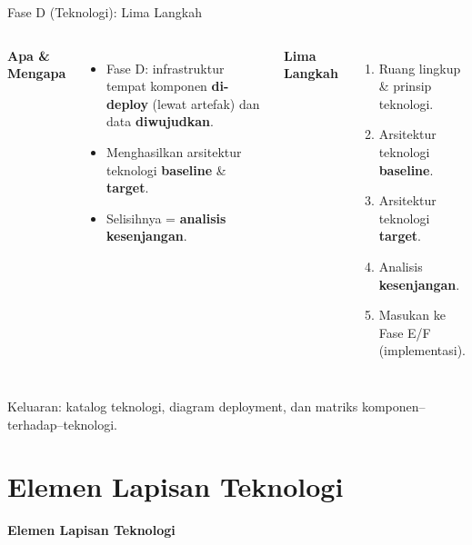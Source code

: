 \documentclass[aspectratio=169, table]{beamer}
\newcommand{\sectionframe}[1]{%
  \begin{frame}{\hfill}
    \centering
    \Huge{\textbf{#1}}
  \end{frame}
}
\newcommand{\takeaway}[1]{%
  \vspace{4pt}
  {\footnotesize #1}
}
\begin{document}
\begin{frame}{Fase D (Teknologi): Lima Langkah}
  \vspace{2pt}
  \footnotesize
  \begin{columns}[t]
    \textbf{Apa \& Mengapa}
    \begin{itemize}\setlength{\itemsep}{2.5pt}
      \item Fase D: infrastruktur tempat komponen \textbf{di-deploy} (lewat
            artefak) dan data \textbf{diwujudkan}.
      \item Menghasilkan arsitektur teknologi \textbf{baseline} \&
            \textbf{target}.
      \item Selisihnya = \textbf{analisis kesenjangan}.
    \end{itemize}
    \textbf{Lima Langkah}
    \begin{enumerate}\setlength{\itemsep}{2.5pt}
      \item Ruang lingkup \& prinsip teknologi.
      \item Arsitektur teknologi \textbf{baseline}.
      \item Arsitektur teknologi \textbf{target}.
      \item Analisis \textbf{kesenjangan}.
      \item Masukan ke Fase E/F (implementasi).
    \end{enumerate}
  \end{columns}
  \vspace{2pt}
  \takeaway{Keluaran: katalog teknologi, diagram deployment, dan matriks
  komponen--terhadap--teknologi.}
\end{frame}

\section{Elemen Lapisan Teknologi}
\sectionframe{Elemen Lapisan Teknologi}
\end{document}
